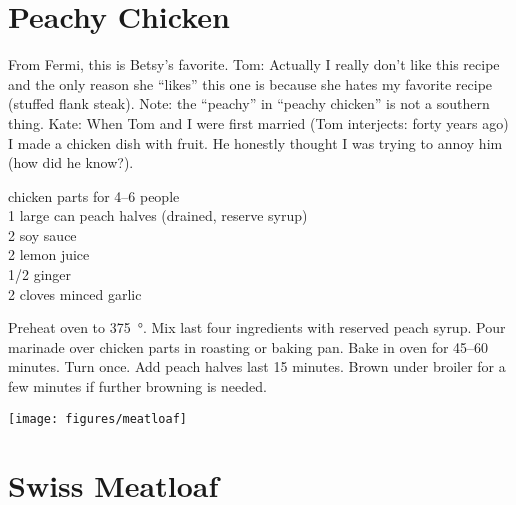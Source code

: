 \section{Peachy Chicken}

\begin{open}
  From Fermi, this is Betsy's favorite.  Tom: Actually I really don't
  like this recipe and the only reason she ``likes'' this one is because she
  hates my favorite recipe (stuffed flank steak).  Note: the ``peachy'' in
  ``peachy chicken'' is not a southern thing.  Kate: When Tom and I were first
  married (Tom interjects: forty years ago) I made a chicken dish with fruit.
  He honestly thought I was trying to annoy him (how did he know?).
\end{open}
\begin{ingredients}
  chicken parts for \numrange{4}{6} people\\
  1 large can peach halves (drained, reserve syrup)\\
  \SI{2}{\tblspoon} soy sauce\\
  \SI{2}{\tblspoon} lemon juice\\
  \SI{1/2}{\tblspoon} ginger\\
  2 cloves minced garlic
\end{ingredients}
Preheat oven to \SI{375}{\degree}.  Mix last four ingredients with reserved peach
syrup.  Pour marinade over chicken parts in roasting or baking pan. Bake in
oven for \numrange{45}{60} minutes. Turn once.  Add peach halves last
15 minutes.  Brown under broiler for a few minutes if further browning
is needed.
\begin{center}
    \texttt{[image: figures/meatloaf]}
\end{center}

\section{Swiss Meatloaf}
\label{sec:swiss-meatloaf}

